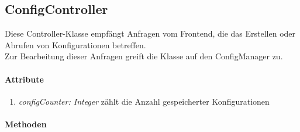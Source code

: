 \subsection*{ConfigController}\label{ConCon}
Diese Controller-Klasse empfängt Anfragen vom Frontend, die das Erstellen oder Abrufen von Konfigurationen betreffen. \\Zur Bearbeitung dieser Anfragen greift die Klasse auf den ConfigManager zu.


\paragraph{Attribute}
\begin{enumerate}[$\bullet$]
	\item \textit{configCounter: Integer} zählt die Anzahl gespeicherter Konfigurationen
\end{enumerate}

\paragraph{Methoden}


